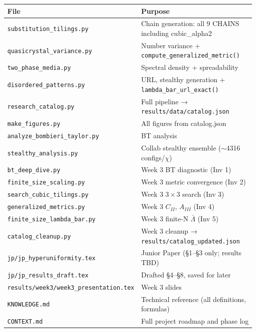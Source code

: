 \documentclass[11pt,letterpaper]{article}
\begin{document}
{\footnotesize
\begin{tabular}{ll}
\toprule
\textbf{File} & \textbf{Purpose} \\
\midrule
\texttt{substitution\_tilings.py} & Chain generation: all 9 CHAINS including cubic\_alpha2 \\
\texttt{quasicrystal\_variance.py} & Number variance + \texttt{compute\_generalized\_metric()} \\
\texttt{two\_phase\_media.py}      & Spectral density + spreadability \\
\texttt{disordered\_patterns.py}   & URL, stealthy generation + \texttt{lambda\_bar\_url\_exact()} \\
\texttt{research\_catalog.py}      & Full pipeline → \texttt{results/data/catalog.json} \\
\texttt{make\_figures.py}          & All figures from catalog.json \\
\texttt{analyze\_bombieri\_taylor.py} & BT analysis \\
\texttt{stealthy\_analysis.py}     & Collab stealthy ensemble ($\sim$4316 configs/$\chi$) \\
\texttt{bt\_deep\_dive.py}         & Week 3 BT diagnostic (Inv 1) \\
\texttt{finite\_size\_scaling.py}  & Week 3 metric convergence (Inv 2) \\
\texttt{search\_cubic\_tilings.py} & Week 3 $3\times3$ search (Inv 3) \\
\texttt{generalized\_metrics.py}   & Week 3 $C_{II}$, $A_{III}$ (Inv 4) \\
\texttt{finite\_size\_lambda\_bar.py} & Week 3 finite-N $\bar\Lambda$ (Inv 5) \\
\texttt{catalog\_cleanup.py}       & Week 3 cleanup → \texttt{results/catalog\_updated.json} \\
\midrule
\texttt{jp/jp\_hyperuniformity.tex} & Junior Paper (§1–§3 only; results TBD) \\
\texttt{jp/jp\_results\_draft.tex} & Drafted §4–§8, saved for later \\
\texttt{results/week3/week3\_presentation.tex} & Week 3 slides \\
\texttt{KNOWLEDGE.md}              & Technical reference (all definitions, formulas) \\
\texttt{CONTEXT.md}                & Full project roadmap and phase log \\
\bottomrule
\end{tabular}
}

\end{document}
